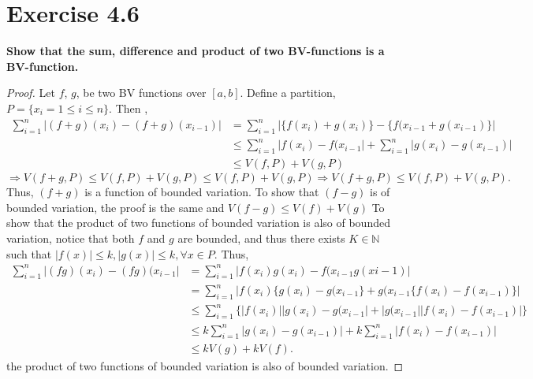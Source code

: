 \documentclass[paper=a4, fontsize=11pt]{scrartcl} %
\begin{document}
\section*{Exercise 4.6}
\boldmath
\textbf{Show that the sum, difference and product of two BV-functions is a BV-function.}
\unboldmath
\begin{proof}
Let $f$, $g$, be two BV functions over $[a, b]$.  Define a partition, $P = \{x_i = 1 \leq i \leq n \}.$  Then ,
\begin{align*}
\sum_{i = 1}^{n} | (f + g )(x_i) - (f + g)(x_{i-1}) | &= \sum_{i = 1}^{n} | \{ f(x_i) + g(x_i) \} - \{ f(x_{i - 1} + g(x_{i-1}) \} |
\\  &\leq \sum_{i = 1}^{n} | f(x_i) - f(x_{i - 1} | + \sum_{i = 1}^{n} | g(x_i) - g(x_{i - 1})|
\\  &\leq  V(f, P) + V(g, P)
\end{align*} 
$\Rightarrow V(f + g, P) \leq V(f, P) + V(g, P) \leq V(f, P) + V(g, P)
\Rightarrow V(f + g, P) \leq V(f, P) + V(g, P).$
Thus, $(f + g)$ is a function of bounded variation.
\newline To show that $(f - g)$ is of bounded variation, the proof is the same and $V(f - g) \leq V(f) + V(g)$
\newline
To show that the product of two functions of bounded variation is also of bounded variation, notice that both $f$ and $g$ are bounded, and thus there exists $K \in \mathbb{N}$ such that
$|f(x)| \leq k, |g(x) | \leq k, \forall x \in P$.
\newline
Thus, 
\begin{align*}
\sum_{i = 1}^{n} | (fg)(x_i) - (fg)(x_{i - 1}|&= \sum_{i = 1}^{n} | f(x_i)g(x_i) - f(x_{i -1}g(x{i - 1})|
\\ &= \sum_{i = 1}^{n} |f(x_i) \{g(x_i) - g(x_{i - 1} \} + g(x_{i-1} \{ f(x_i) - f(x_{i - 1}) \} |
\\ &\leq \sum_{i = 1}^{n} \{ | f(x_i) | |g(x_i)  - g(x_{i - 1} | + | g(x_{i - 1} | | f(x_i) - f(x_{i - 1}) | \}
\\ &\leq k \sum_{i = 1}^{n} |g(x_i) - g(x_{i-1}) | + k \sum_{i = 1}^{n} | f(x_i) - f(x_{i -1})|
\\ &\leq k V(g) + kV(f).
\end{align*}
the product of two functions of bounded variation is also of bounded variation.
\end{proof}

\end{document}
